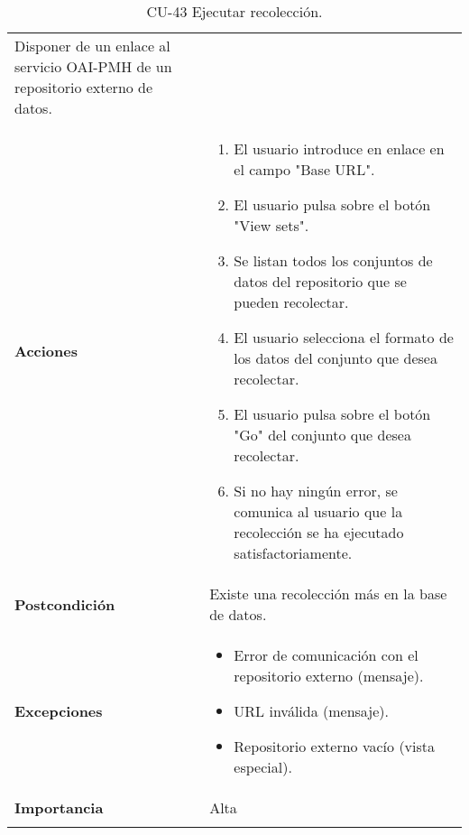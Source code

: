 \begin{longtable}[]{@{}ll@{}}
\begin{minipage}[t]{0.76\columnwidth}
Disponer de un enlace al servicio OAI-PMH de un repositorio externo de
datos.\strut
\end{minipage}\tabularnewline
\begin{minipage}[t]{0.18\columnwidth}\raggedright
\textbf{Acciones}\strut
\end{minipage} & \begin{minipage}[t]{0.76\columnwidth}\raggedright
\begin{enumerate}
\def\labelenumi{\arabic{enumi}.}
\tightlist
\item
  El usuario introduce en enlace en el campo "Base URL".
\item
  El usuario pulsa sobre el botón "View sets".
\item
  Se listan todos los conjuntos de datos del repositorio que se pueden
  recolectar.
\item
  El usuario selecciona el formato de los datos del conjunto que desea
  recolectar.
\item
  El usuario pulsa sobre el botón "Go" del conjunto que desea
  recolectar.
\item
  Si no hay ningún error, se comunica al usuario que la recolección se
  ha ejecutado satisfactoriamente.
\end{enumerate}\strut
\end{minipage}\tabularnewline
\begin{minipage}[t]{0.18\columnwidth}\raggedright
\textbf{Postcondición}\strut
\end{minipage} & \begin{minipage}[t]{0.76\columnwidth}\raggedright
Existe una recolección más en la base de datos.\strut
\end{minipage}\tabularnewline
\begin{minipage}[t]{0.18\columnwidth}\raggedright
\textbf{Excepciones}\strut
\end{minipage} & \begin{minipage}[t]{0.76\columnwidth}\raggedright
\begin{itemize}
\tightlist
\item
  Error de comunicación con el repositorio externo (mensaje).
\item
  URL inválida (mensaje).
\item
  Repositorio externo vacío (vista especial).
\end{itemize}\strut
\end{minipage}\tabularnewline
\begin{minipage}[t]{0.18\columnwidth}\raggedright
\textbf{Importancia}\strut
\end{minipage} & \begin{minipage}[t]{0.76\columnwidth}\raggedright
Alta\strut
\end{minipage}\tabularnewline
\bottomrule
\caption{CU-43 Ejecutar recolección.}
\end{longtable}

